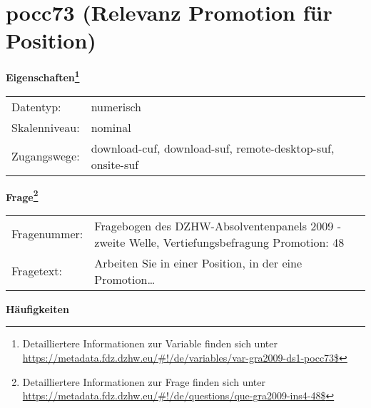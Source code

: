 
    \setcounter{footnote}{0}

    \vspace*{-1.8cm}
	\section{pocc73 (Relevanz Promotion für Position)}
	\label{section:pocc73}



    \vspace*{0.5cm}
    \noindent\textbf{Eigenschaften\footnote{Detailliertere Informationen zur Variable finden sich unter
		\url{https://metadata.fdz.dzhw.eu/\#!/de/variables/var-gra2009-ds1-pocc73$}}}\\
	\begin{tabularx}{\hsize}{@{}lX}
	Datentyp: & numerisch \\
	Skalenniveau: & nominal \\
	Zugangswege: &
	  download-cuf, 
	  download-suf, 
	  remote-desktop-suf, 
	  onsite-suf
 \\
    \end{tabularx}



				\vspace*{0.5cm}
                \noindent\textbf{Frage\footnote{Detailliertere Informationen zur Frage finden sich unter
		              \url{https://metadata.fdz.dzhw.eu/\#!/de/questions/que-gra2009-ins4-48$}}}\\
				\begin{tabularx}{\hsize}{@{}lX}
					Fragenummer: &
					  Fragebogen des DZHW-Absolventenpanels 2009 - zweite Welle, Vertiefungsbefragung Promotion:
					  48
 \\
					Fragetext: & Arbeiten Sie in einer Position, in der eine Promotion… \\
				\end{tabularx}





        		\vspace*{0.5cm}
                \noindent\textbf{Häufigkeiten}

